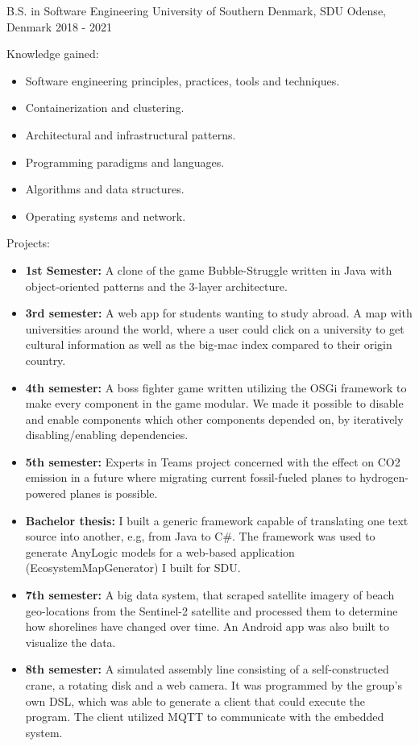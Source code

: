 \begin{cventries}
\cventry
{B.S. in Software Engineering} %
{University of Southern Denmark, SDU} %
{Odense, Denmark} %
{2018 - 2021} %
{
  \begin{cvitems} %
    \item {Knowledge gained: }
    \begin{itemize} %
      \item {Software engineering principles, practices, tools and techniques.}
      \item {Containerization and clustering.}
      \item {Architectural and infrastructural patterns.}
      \item {Programming paradigms and languages.}
      \item {Algorithms and data structures.}
      \item {Operating systems and network.}
    \end{itemize}
    \item {Projects: }
    \begin{itemize} %
      \item {\textbf{1st Semester:} A clone of the game Bubble-Struggle written in Java with object-oriented patterns and the 3-layer architecture.}
      \item {\textbf{3rd semester:} A web app for students wanting to study abroad. A map with universities around the world, where a user could click on a university to get cultural information as well as the big-mac index compared to their origin country.}
      \item {\textbf{4th semester:} A boss fighter game written utilizing the OSGi framework to make every component in the game modular. We made it possible to disable and enable components which other components depended on, by iteratively disabling/enabling dependencies.}
      \item {\textbf{5th semester:} Experts in Teams project concerned with the effect on CO2 emission in a future where migrating current fossil-fueled planes to hydrogen-powered planes is possible. }
      \item {\textbf{Bachelor thesis:} I built a generic framework capable of translating one text source into another, e.g, from Java to C\#. The framework was used to generate AnyLogic models for a web-based application (EcosystemMapGenerator) I built for SDU.}
      \item {\textbf{7th semester:} A big data system, that scraped satellite imagery of beach geo-locations from the Sentinel-2 satellite and processed them to determine how shorelines have changed over time. An Android app was also built to visualize the data.}
      \item {\textbf{8th semester:} A simulated assembly line consisting of a self-constructed crane, a rotating disk and a web camera. It was programmed by the group's own DSL, which was able to generate a client that could execute the program. The client utilized MQTT to communicate with the embedded system.}
    \end{itemize}
  \end{cvitems}
}


\end{cventries}
